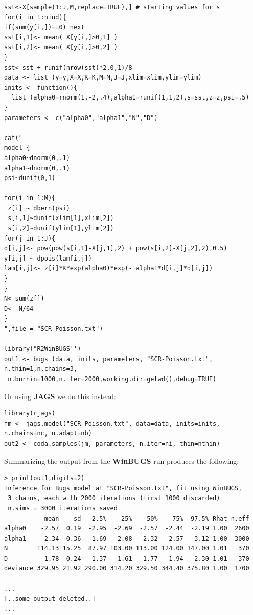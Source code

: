 {\small
\begin{verbatim}
sst<-X[sample(1:J,M,replace=TRUE),] # starting values for s
for(i in 1:nind){
if(sum(y[i,])==0) next
sst[i,1]<- mean( X[y[i,]>0,1] )
sst[i,2]<- mean( X[y[i,]>0,2] )
}
sst<-sst + runif(nrow(sst)*2,0,1)/8
data <- list (y=y,X=X,K=K,M=M,J=J,xlim=xlim,ylim=ylim)
inits <- function(){
  list (alpha0=rnorm(1,-2,.4),alpha1=runif(1,1,2),s=sst,z=z,psi=.5)
}
parameters <- c("alpha0","alpha1","N","D")

cat("
model {
alpha0~dnorm(0,.1)
alpha1~dnorm(0,.1)
psi~dunif(0,1)

for(i in 1:M){
 z[i] ~ dbern(psi)
 s[i,1]~dunif(xlim[1],xlim[2])
 s[i,2]~dunif(ylim[1],ylim[2])
for(j in 1:J){
d[i,j]<- pow(pow(s[i,1]-X[j,1],2) + pow(s[i,2]-X[j,2],2),0.5)
y[i,j] ~ dpois(lam[i,j])
lam[i,j]<- z[i]*K*exp(alpha0)*exp(- alpha1*d[i,j]*d[i,j])
}
}
N<-sum(z[])
D<- N/64
}
",file = "SCR-Poisson.txt")

library("R2WinBUGS'')
out1 <- bugs (data, inits, parameters, "SCR-Poisson.txt", n.thin=1,n.chains=3,
 n.burnin=1000,n.iter=2000,working.dir=getwd(),debug=TRUE)
\end{verbatim}
}
{\flushleft Or using {\bf JAGS}  we do this instead: }
{\small
\begin{verbatim}
library(rjags)
fm <- jags.model("SCR-Poisson.txt", data=data, inits=inits, n.chains=nc, n.adapt=nb)
out2 <- coda.samples(jm, parameters, n.iter=ni, thin=nthin)
\end{verbatim}
}
{\flushleft 
Summarizing } the output from the {\bf WinBUGS}  run produces the following:
{\small
\begin{verbatim}
> print(out1,digits=2)
Inference for Bugs model at "SCR-Poisson.txt", fit using WinBUGS,
 3 chains, each with 2000 iterations (first 1000 discarded)
 n.sims = 3000 iterations saved
           mean    sd   2.5%    25%    50%    75%  97.5% Rhat n.eff
alpha0    -2.57  0.19  -2.95  -2.69  -2.57  -2.44  -2.19 1.00  2600
alpha1     2.34  0.36   1.69   2.08   2.32   2.57   3.12 1.00  3000
N        114.13 15.25  87.97 103.00 113.00 124.00 147.00 1.01   370
D          1.78  0.24   1.37   1.61   1.77   1.94   2.30 1.01   370
deviance 329.95 21.92 290.00 314.20 329.50 344.40 375.80 1.00  1700

...
[..some output deleted..]
...
\end{verbatim}
}




